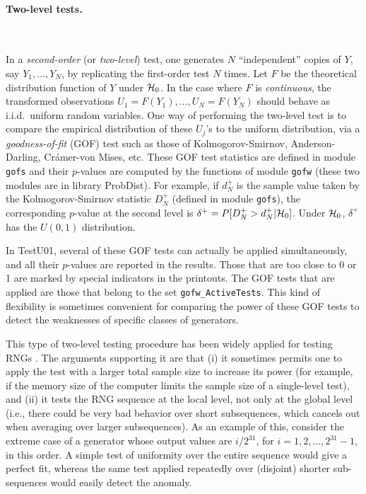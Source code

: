 \paragraph*{Two-level tests.} \

In a {\em second-order\/} (or {\em two-level\/}) test, one generates
$N$ ``independent'' copies of $Y$, say $Y_1,\dots,Y_N$, by replicating
the first-order test $N$ times.
Let $F$ be the theoretical distribution function of $Y$ under $\mathcal{H}_0$.
In the case where $F$ is {\em continuous}, the transformed observations
$U_1 = F(Y_1),\dots, U_N = F(Y_N)$ should behave as i.i.d.\ uniform
random variables.
One way of performing the two-level test is to compare the empirical
distribution of these $U_j$'s to the uniform
distribution, via a {\em goodness-of-fit\/} (GOF) test such as
those of Kolmogorov-Smirnov, Anderson-Darling, Cr\'amer-von Mises, etc.
These GOF test statistics are defined in module {\tt gofs} and their
$p$-values are computed by the functions of module {\tt gofw}
(these two modules are in library ProbDist).
For example, if $d_N^+$ is the sample value taken by the Kolmogorov-Smirnov
statistic $D_N^+$ (defined in module {\tt gofs}), the corresponding
$p$-value at the second level is $\delta^+ = P[D_N^+ > d_N^+ | \mathcal{H}_0]$.
Under $\mathcal{H}_0$, $\delta^+$ has the $U(0,1)$ distribution.

In TestU01, several of these GOF tests can actually be applied
simultaneously, and all their $p$-values are reported in the results.
Those that are too close to 0 or 1 are marked by special indicators
in the printouts.  %
The GOF tests that are applied are those that belong to the set
{\tt gofw\_ActiveTests}.
This kind of flexibility is sometimes convenient for comparing the
power of these GOF tests to detect the weaknesses of specific classes
of generators.

This type of two-level testing procedure has been widely applied for
testing RNGs \cite{sFIS96a,rKNU98a,rLEC92a,rLEE97a,rMAR85a}.
The arguments supporting it are that
(i) it sometimes permits one to apply the test with a larger total
sample size to increase its power
(for example, if the memory size of the computer
limits the sample size of a single-level test), and
(ii) it tests the RNG sequence at the local level,
not only at the global level (i.e., there could be very bad behavior
over short subsequences, which cancels out when averaging
over larger subsequences).
As an example of this, consider the extreme case of a generator
whose output values are $i/2^{31}$, for $i=1,2,\dots,2^{31}-1$,
in this order.
A simple test of uniformity over the entire sequence would give
a perfect fit, whereas the same test applied repeatedly over
(disjoint) shorter sub-sequences would easily detect the anomaly.


